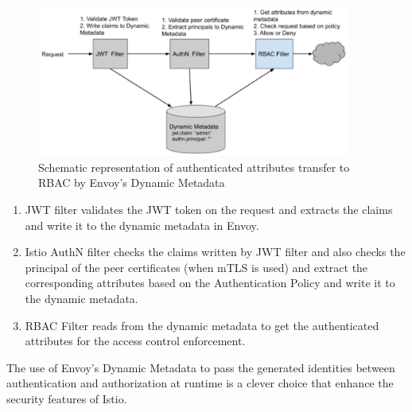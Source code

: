 \begin{figure}[ht]
    \centering
    \includegraphics[width=0.92\textwidth]{chapters/images/chp3/authn-authz-ex.png}
    \caption{Schematic representation of authenticated attributes transfer to RBAC by Envoy's Dynamic Metadata}
    \label{fig:authn-authz}
\end{figure}

\begin{enumerate}
    \item JWT filter validates the JWT token on the request and extracts the claims and write it to the dynamic metadata in Envoy.
    \item Istio AuthN filter checks the claims written by JWT filter and also checks the principal of the peer certificates (when mTLS is used) and extract the corresponding attributes based on the Authentication Policy and write it to the dynamic metadata.
    \item RBAC Filter reads from the dynamic metadata to get the authenticated attributes for the access control enforcement.
\end{enumerate}

\noindent The use of Envoy's Dynamic Metadata to pass the generated identities between authentication and authorization at runtime is a clever choice that enhance the security features of Istio.
